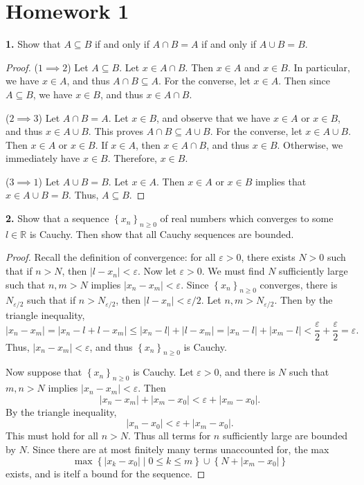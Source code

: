\section{Homework 1}

\textbf{1.} Show that $A\subseteq B$  if and only if $A \cap B = A$ if and only if $A \cup B = B$.

\begin{proof}
	($1\implies 2$) Let $A\subseteq B$. Let $x\in A \cap B$. Then $x\in A$ and $x\in B$. In particular, we have $x\in A$, and thus $A \cap B \subseteq A$. For the converse, let $x\in A$. Then since $A\subseteq B$, we have $x\in B$, and thus $x\in A \cap B$.

	($2\implies 3$) Let $A \cap B = A$. Let $x\in B$, and observe that we have $x\in A$ or $x\in B$, and thus $x\in A \cup B$. This proves $A \cap B \subseteq A \cup B$. For the converse, let $x\in A \cup B$. Then $x\in A$ or $x\in B$. If $x\in A$, then $x\in A \cap B$, and thus $x\in B$. Otherwise, we immediately have $x\in B$.  Therefore, $x\in B$.

	($3\implies 1$) Let $A\cup B = B$. Let $x\in A$. Then $x\in A$ or $x\in B$ implies that $x\in A \cup B = B$. Thus, $A\subseteq B$.
\end{proof}

\textbf{2.} Show that a sequence $\left\{ x_n \right\}_{n\geq 0} $ of real numbers which converges to some $l\in\mathbb{R} $ is Cauchy. Then show that all Cauchy sequences are bounded.

\begin{proof}
	Recall the definition of convergence: for all $\varepsilon>0$, there exists $N>0$ such that if $n>N$, then $\left| l - x_n \right| < \varepsilon $. Now let $\varepsilon >0$. We must find $N$ sufficiently large such that $n,m>N$ implies $\left| x_n - x_m \right| <\varepsilon $. Since $\left\{ x_n \right\}_{n\geq 0} $ converges, there is $N_{\varepsilon /2} $ such that if $n>N_{\varepsilon /2} $, then $\left| l-x_n \right| < \varepsilon /2 $. Let $n,m>N_{\varepsilon /2} $. Then by the triangle inequality,
	\[
		\left| x_n - x_m \right| =\left| x_n - l + l - x_m \right| \leq \left| x_n-l \right| +\left| l-x_m \right| =\left| x_n-l \right| +\left| x_m-l \right| < \frac{\varepsilon }{2} +\frac{\varepsilon }{2} =\varepsilon 
	.\]
	Thus, $\left| x_n - x_m \right| <\varepsilon $, and thus $\left\{ x_n \right\} _{n\geq 0} $ is Cauchy.

	Now suppose that $\left\{ x_n \right\}_{n\geq 0} $ is Cauchy. Let $\varepsilon >0$, and there is $N$ such that $m,n>N$ implies $\left| x_n - x_m \right| <\varepsilon $. Then
	\[
		\left| x_n-x_m \right| +\left| x_m - x_0 \right| <\varepsilon + \left| x_m-x_0 \right| 
	.\]
	By the triangle inequality,
	\[
		\left| x_n - x_0 \right| <\varepsilon +\left| x_m-x_0 \right| 
	.\]
	This must hold for all $n>N$. Thus all terms for $n$ sufficiently large are bounded by $N$. Since there are at most finitely many terms unaccounted for, the max
	\[
		\max \left\{ \left| x_k - x_0 \right| \mid 0\leq k\leq m \right\} \cup \left\{ N+\left| x_m-x_0 \right|  \right\} 
	\]
	exists, and is itelf a bound for the sequence.
\end{proof}

